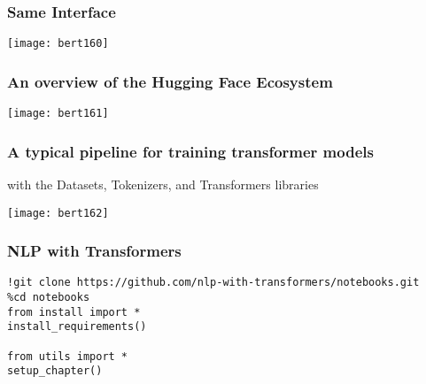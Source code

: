 \begin{frame}[fragile]\frametitle{Same Interface}
			\begin{center}
			\texttt{[image: bert160]}
			\end{center}	
\end{frame}

\begin{frame}[fragile]\frametitle{An overview of the Hugging Face Ecosystem}
			\begin{center}
			\texttt{[image: bert161]}
			\end{center}	
			
\end{frame}

\begin{frame}[fragile]\frametitle{A typical pipeline for training transformer models }

with the  Datasets,  Tokenizers, and  Transformers libraries

			\begin{center}
			\texttt{[image: bert162]}
			\end{center}	
			
\end{frame}

\begin{frame}[fragile]\frametitle{NLP with Transformers}

\begin{lstlisting}
!git clone https://github.com/nlp-with-transformers/notebooks.git
%cd notebooks
from install import *
install_requirements()

from utils import *
setup_chapter()
\end{lstlisting}
			
\end{frame}

